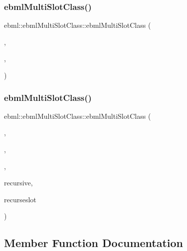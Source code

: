 \subsubsection{\texorpdfstring{ebml\+Multi\+Slot\+Class()}{ebmlMultiSlotClass()}\hspace{0.1cm}{\footnotesize\ttfamily [3/4]}}
{\footnotesize\ttfamily ebml\+::ebml\+Multi\+Slot\+Class\+::ebml\+Multi\+Slot\+Class (\begin{DoxyParamCaption}\item[{\mbox{\hyperlink{namespaceebml_a86c5f604ddf12a74aa9812e997a58691}{ebml\+I\+D\+\_\+t}}}]{,  }\item[{const std\+::wstring \&}]{,  }\item[{const \mbox{\hyperlink{namespaceebml_abdc1248164e4e424423defac9fff7d4d}{slot\+Spec\+\_\+l}} \&}]{ }\end{DoxyParamCaption})}

\mbox{\label{classebml_1_1ebmlMultiSlotClass_ac657dd7c6bd7a89928df88babbff9009}} 
\subsubsection{\texorpdfstring{ebml\+Multi\+Slot\+Class()}{ebmlMultiSlotClass()}\hspace{0.1cm}{\footnotesize\ttfamily [4/4]}}
{\footnotesize\ttfamily ebml\+::ebml\+Multi\+Slot\+Class\+::ebml\+Multi\+Slot\+Class (\begin{DoxyParamCaption}\item[{\mbox{\hyperlink{namespaceebml_a86c5f604ddf12a74aa9812e997a58691}{ebml\+I\+D\+\_\+t}}}]{,  }\item[{const std\+::wstring \&}]{,  }\item[{const \mbox{\hyperlink{namespaceebml_abdc1248164e4e424423defac9fff7d4d}{slot\+Spec\+\_\+l}} \&}]{,  }\item[{const \mbox{\hyperlink{structebml_1_1occurSpec__t}{occur\+Spec\+\_\+t}} \&}]{recursive,  }\item[{size\+\_\+t}]{recurseslot }\end{DoxyParamCaption})}



\subsection{Member Function Documentation}
\mbox{\label{classebml_1_1ebmlMultiSlotClass_a51b5c0c3c0aa3c2e54e63f536413b5a5}} 
